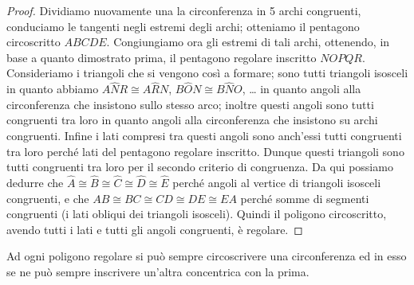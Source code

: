 \begin{proof}
Dividiamo nuovamente una la circonferenza in 5 archi congruenti, 
conduciamo le tangenti negli estremi degli archi; otteniamo il 
pentagono circoscritto $ABCDE$.
Congiungiamo ora gli estremi di tali archi, ottenendo, in base a 
quanto dimostrato prima, il pentagono regolare inscritto $NOPQR$. 
Consideriamo i triangoli che si vengono così a formare; sono tutti 
triangoli isosceli in quanto abbiamo $A\widehat{N}R\cong 
A\widehat{R}N$, $B\widehat{O}N\cong B\widehat{N}O$, \ldots{} in 
quanto angoli alla circonferenza che insistono sullo stesso arco; 
inoltre questi angoli sono tutti congruenti tra loro in quanto angoli 
alla circonferenza che insistono su archi congruenti. Infine i lati 
compresi tra questi angoli sono anch'essi tutti congruenti tra loro 
perché lati del pentagono regolare inscritto. Dunque questi triangoli 
sono tutti congruenti tra loro per il secondo criterio di congruenza. 
Da qui possiamo dedurre che $\widehat{A}\cong \widehat{B}\cong 
\widehat{C}\cong \widehat{D}\cong \widehat{E}$ perché angoli al 
vertice di triangoli isosceli congruenti, e che $AB\cong BC\cong 
CD\cong DE\cong EA$ perché somme di segmenti congruenti (i lati 
obliqui dei triangoli isosceli). Quindi il poligono circoscritto, 
avendo tutti i lati e tutti gli angoli congruenti, è regolare.
\end{proof}

\begin{teorema}\label{teo:poly_reg_circ_inscr_circos}
Ad ogni poligono regolare si può sempre circoscrivere una 
circonferenza ed in esso se ne può sempre inscrivere un'altra 
concentrica con la prima.
\end{teorema}


\begin{inaccessibleblock}
 \begin{figure}[!htb]
	\centering
\end{figure}
\end{inaccessibleblock}

